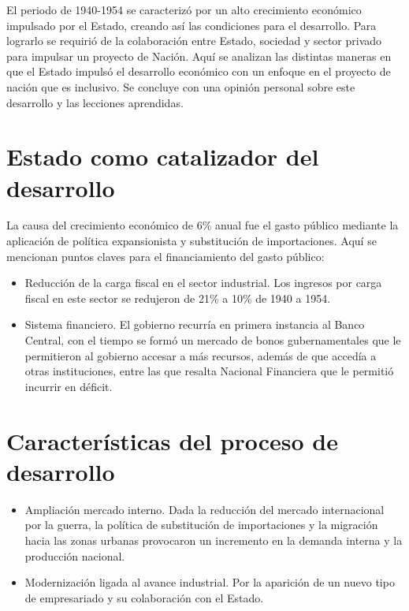 
El periodo de 1940-1954 se caracterizó por un alto crecimiento económico impulsado por el Estado, creando así las condiciones para el desarrollo. Para lograrlo se requirió de la colaboración entre Estado, sociedad y sector privado para impulsar un proyecto de Nación. Aquí se analizan las distintas maneras en que el Estado impulsó el desarrollo económico con un enfoque en el proyecto de nación que es inclusivo. Se concluye con una opinión personal sobre este desarrollo y las lecciones aprendidas.

\section{Estado como catalizador del desarrollo}
La causa del crecimiento económico de 6\% anual fue el gasto público mediante la aplicación de política expansionista y substitución de importaciones. Aquí se mencionan puntos claves para el financiamiento del gasto público:
\begin{itemize}
    \item Reducción de la carga fiscal en el sector industrial. Los ingresos por carga fiscal en este sector se redujeron de 21\% a 10\% de 1940 a 1954.
    \item Sistema financiero. El gobierno recurría en primera instancia al Banco Central, con el tiempo se formó un mercado de bonos gubernamentales que le permitieron al gobierno accesar a más recursos, además de que accedía a otras instituciones, entre las que resalta Nacional Financiera que le permitió incurrir en déficit.
\end{itemize}

\section{Características del proceso de desarrollo}
\begin{itemize}
    \item Ampliación mercado interno. Dada la reducción del mercado internacional por la guerra, la política de substitución de importaciones y la migración hacia las zonas urbanas provocaron un incremento en la demanda interna y la producción nacional.
    \item Modernización ligada al avance industrial. Por la aparición de un nuevo tipo de empresariado y su colaboración con el Estado.
\end{itemize}

